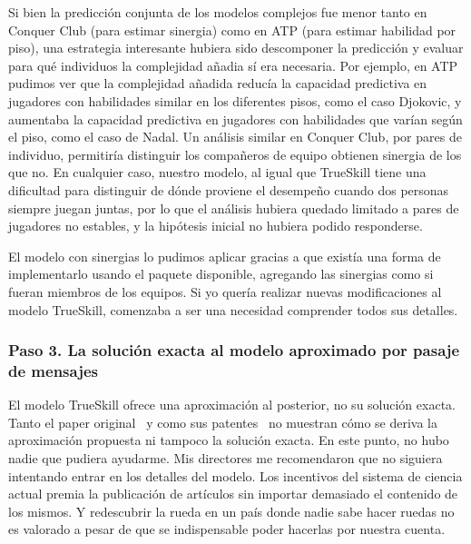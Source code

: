 \documentclass[a4paper,11pt]{book}
\theoremstyle{definition}
\begin{document}

Si bien la predicción conjunta de los modelos complejos fue menor tanto en Conquer Club (para estimar sinergia) como en ATP (para estimar habilidad por piso), una estrategia interesante hubiera sido descomponer la predicción y evaluar para qué individuos la complejidad añadia sí era necesaria.
%
Por ejemplo, en ATP pudimos ver que la complejidad añadida reducía la capacidad predictiva en jugadores con habilidades similar en los diferentes pisos, como el caso Djokovic, y aumentaba la capacidad predictiva en jugadores con habilidades que varían según el piso, como el caso de Nadal.
%
Un análisis similar en Conquer Club, por pares de individuo, permitiría distinguir los compañeros de equipo obtienen sinergia de los que no.
%
En cualquier caso, nuestro modelo, al igual que TrueSkill tiene una dificultad para distinguir de dónde proviene el desempeño cuando dos personas siempre juegan juntas, por lo que el análisis hubiera quedado limitado a pares de jugadores no estables, y la hipótesis inicial no hubiera podido responderse.


El modelo con sinergias lo pudimos aplicar gracias a que existía una forma de implementarlo usando el paquete disponible, agregando las sinergias como si fueran miembros de los equipos.
%
Si yo quería realizar nuevas modificaciones al modelo TrueSkill, comenzaba a ser una necesidad comprender todos sus detalles.

\subsubsection{Paso 3. La solución exacta al modelo aproximado por pasaje de mensajes}

El modelo TrueSkill ofrece una aproximación al posterior, no su solución exacta.
%
Tanto el paper original~\cite{Herbrich2007} y como sus patentes~\cite{trueskill_patent_06, trueskill_patent_09} no muestran cómo se deriva la aproximación propuesta ni tampoco la solución exacta.
%
En este punto, no hubo nadie que pudiera ayudarme.
%
Mis directores me recomendaron que no siguiera intentando entrar en los detalles del modelo.
%
Los incentivos del sistema de ciencia actual premia la publicación de artículos sin importar demasiado el contenido de los mismos.
%
Y redescubrir la rueda en un país donde nadie sabe hacer ruedas no es valorado a pesar de que se indispensable poder hacerlas por nuestra cuenta.

\end{document}
